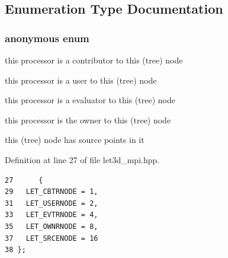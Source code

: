 \subsection{Enumeration Type Documentation}
\subsubsection{\setlength{\rightskip}{0pt plus 5cm}anonymous enum}\label{let3d__mpi_8hpp_dca29a1140aadadfd92b34a02fa516ef_dca29a1140aadadfd92b34a02fa516ef}


\begin{Desc}
\item[Enumerator: ]\par
\begin{description}
\item[{\em 
LET\_\-CBTRNODE\label{let3d__mpi_8hpp_dca29a1140aadadfd92b34a02fa516ef_dca29a1140aadadfd92b34a02fa516efbdc2fa12ef59a2115edf9a7465249d08}
}]this processor is a contributor to this (tree) node \item[{\em 
LET\_\-USERNODE\label{let3d__mpi_8hpp_dca29a1140aadadfd92b34a02fa516ef_dca29a1140aadadfd92b34a02fa516efb1bc42142d5c9d361be39bcafd715bb6}
}]this processor is a user to this (tree) node \item[{\em 
LET\_\-EVTRNODE\label{let3d__mpi_8hpp_dca29a1140aadadfd92b34a02fa516ef_dca29a1140aadadfd92b34a02fa516efac1af3b6a1e6fbf670aa39fd00c30523}
}]this processor is a evaluator to this (tree) node \item[{\em 
LET\_\-OWNRNODE\label{let3d__mpi_8hpp_dca29a1140aadadfd92b34a02fa516ef_dca29a1140aadadfd92b34a02fa516efab9b53cee58560318adb7d8e93384679}
}]this processor is the owner to this (tree) node \item[{\em 
LET\_\-SRCENODE\label{let3d__mpi_8hpp_dca29a1140aadadfd92b34a02fa516ef_dca29a1140aadadfd92b34a02fa516ef5bc3fd64406b06827f31ac5f17bba16a}
}]this (tree) node has source points in it \end{description}
\end{Desc}



Definition at line 27 of file let3d\_\-mpi.hpp.

\footnotesize\begin{verbatim}27      {
29   LET_CBTRNODE = 1,
31   LET_USERNODE = 2,
33   LET_EVTRNODE = 4,
35   LET_OWNRNODE = 8,
37   LET_SRCENODE = 16 
38 };
\end{verbatim}\normalsize 


